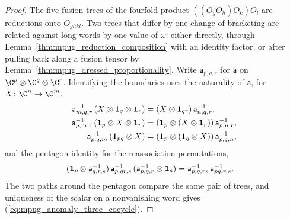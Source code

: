 \begin{proof}\leanok
    The five fusion trees of the fourfold product $((O_gO_h)O_k)O_l$ are
    reductions onto $O_{ghkl}$. Two trees that differ by one change of
    bracketing are related against long words by one value of $\omega$:
    either directly, through Lemma~\ref{thm:mpug_reduction_composition}
    with an identity factor, or after pulling back along a fusion tensor
    by Lemma~\ref{thm:mpug_dressed_proportionality}. Write
    $\mathsf a_{p,q,r}$ for $\mathsf a$ on $\C^p\otimes\C^q\otimes\C^r$.
    Identifying the boundaries uses the naturality of $\mathsf a$, for
    $X\colon\C^n\to\C^m$,
    \begin{align}
        \mathsf a^{-1}_{m,q,r}\,(X\otimes\mathbf 1_q\otimes\mathbf 1_r)
         & =(X\otimes\mathbf 1_{qr})\,\mathsf a^{-1}_{n,q,r},
        \notag                                                                  \\
        \mathsf a^{-1}_{p,m,r}\,(\mathbf 1_p\otimes X\otimes\mathbf 1_r)
         & =(\mathbf 1_p\otimes(X\otimes\mathbf 1_r))\,\mathsf a^{-1}_{p,n,r},
        \notag                                                                  \\
        \mathsf a^{-1}_{p,q,m}\,(\mathbf 1_{pq}\otimes X)
         & =(\mathbf 1_p\otimes(\mathbf 1_q\otimes X))\,\mathsf a^{-1}_{p,q,n},
        \notag
    \end{align}
    and the pentagon identity for the reassociation permutations,
    \begin{align}
        (\mathbf 1_p\otimes\mathsf a^{-1}_{q,r,s})\,\mathsf a^{-1}_{p,qr,s}\,
        (\mathsf a^{-1}_{p,q,r}\otimes\mathbf 1_s)
         & =\mathsf a^{-1}_{p,q,rs}\,\mathsf a^{-1}_{pq,r,s}.
        \notag
    \end{align}
    The two paths around the pentagon
    compare the same pair of trees, and uniqueness of the scalar on a
    nonvanishing word gives (\ref{eq:mpug_anomaly_three_cocycle}).
\end{proof}

